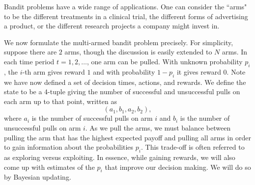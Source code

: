 Bandit problems have a wide range of applications.
One can consider the ``arms" to be the different treatments in a
clinical trial, the different forms of advertising a product,
or the different research projects a company might invest in.

We now formulate the multi-armed bandit problem precisely.
For simplicity, suppose there are $2$ arms, though the
discussion is easily extended to $N$ arms.
In each time period $t= 1,2,\ldots$, one arm can be pulled.
With unknown probability $p_i$, the $i$-th arm gives
reward $1$ and with probability $1-p_i$ it gives reward $0$.
Note we have now defined a set of decision times, actions, and rewards.
We define the state to be a 4-tuple giving the number of successful and unsuccessful
pulls on each arm up to that point, written as
\begin{equation}\label{state}
(a_1,b_1,a_2,b_2),
\end{equation}
where $a_i$ is the number of successful pulls on arm $i$ and $b_i$
is the number of unsuccessful pulls on arm $i$.
As we pull the arms, we must balance between pulling the arm that has
the highest expected payoff and pulling all arms in order to gain
information about the probabilities $p_i$.
This trade-off is often referred to as exploring versus exploiting.
In essence, while gaining rewards, we will also come up with
estimates of the $p_i$ that improve our decision making.
We will do so by Bayesian updating.

